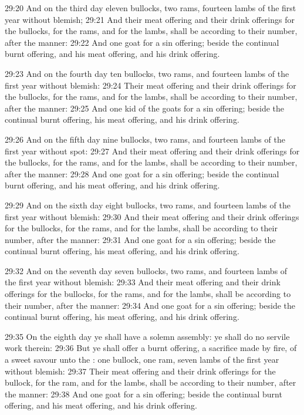 29:20 And on the third day eleven bullocks, two rams, fourteen lambs of the first year without blemish; 29:21 And their meat offering and their drink offerings for the bullocks, for the rams, and for the lambs, shall be according to their number, after the manner: 29:22 And one goat for a sin offering; beside the continual burnt offering, and his meat offering, and his drink offering.

29:23 And on the fourth day ten bullocks, two rams, and fourteen lambs of the first year without blemish: 29:24 Their meat offering and their drink offerings for the bullocks, for the rams, and for the lambs, shall be according to their number, after the manner: 29:25 And one kid of the goats for a sin offering; beside the continual burnt offering, his meat offering, and his drink offering.

29:26 And on the fifth day nine bullocks, two rams, and fourteen lambs of the first year without spot: 29:27 And their meat offering and their drink offerings for the bullocks, for the rams, and for the lambs, shall be according to their number, after the manner: 29:28 And one goat for a sin offering; beside the continual burnt offering, and his meat offering, and his drink offering.

29:29 And on the sixth day eight bullocks, two rams, and fourteen lambs of the first year without blemish: 29:30 And their meat offering and their drink offerings for the bullocks, for the rams, and for the lambs, shall be according to their number, after the manner: 29:31 And one goat for a sin offering; beside the continual burnt offering, his meat offering, and his drink offering.

29:32 And on the seventh day seven bullocks, two rams, and fourteen lambs of the first year without blemish: 29:33 And their meat offering and their drink offerings for the bullocks, for the rams, and for the lambs, shall be according to their number, after the manner: 29:34 And one goat for a sin offering; beside the continual burnt offering, his meat offering, and his drink offering.

29:35 On the eighth day ye shall have a solemn assembly: ye shall do no servile work therein: 29:36 But ye shall offer a burnt offering, a sacrifice made by fire, of a sweet savour unto the \LORD: one bullock, one ram, seven lambs of the first year without blemish: 29:37 Their meat offering and their drink offerings for the bullock, for the ram, and for the lambs, shall be according to their number, after the manner: 29:38 And one goat for a sin offering; beside the continual burnt offering, and his meat offering, and his drink offering.

